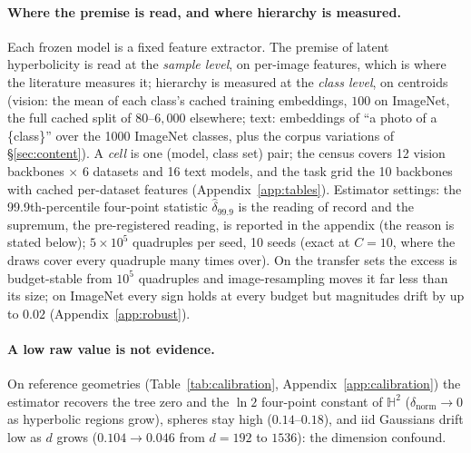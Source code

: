 \paragraph{Where the premise is read, and where hierarchy is measured.} Each frozen model is a fixed feature extractor. The premise of latent hyperbolicity is read at the \emph{sample level}, on per-image features, which is where the literature measures it; hierarchy is measured at the \emph{class level}, on centroids (vision: the mean of each class's cached training embeddings, $100$ on ImageNet, the full cached split of $80$--$6{,}000$ elsewhere; text: embeddings of ``a photo of a \{class\}'' over the 1000 ImageNet classes, plus the corpus variations of \S\ref{sec:content}). A \emph{cell} is one (model, class set) pair; the census covers 12 vision backbones $\times$ 6 datasets and 16 text models, and the task grid the 10 backbones with cached per-dataset features (Appendix~\ref{app:tables}).
Estimator settings: the 99.9th-percentile four-point statistic $\hat\delta_{99.9}$ is the reading of record and the supremum, the pre-registered reading, is reported in the appendix (the reason is stated below); $5{\times}10^5$ quadruples per seed, 10 seeds (exact at $C{=}10$, where the draws cover every quadruple many times over). On the transfer sets the excess is budget-stable from $10^5$ quadruples and image-resampling moves it far less than its size; on ImageNet every sign holds at every budget but magnitudes drift by up to $0.02$ (Appendix~\ref{app:robust}).

\paragraph{A low raw value is not evidence.} On reference geometries (Table~\ref{tab:calibration}, Appendix~\ref{app:calibration}) the estimator recovers the tree zero and the $\ln 2$ four-point constant of $\mathbb{H}^2$ ($\delta_{\text{norm}}\to0$ as hyperbolic regions grow), spheres stay high ($0.14$--$0.18$), and iid Gaussians drift low as $d$ grows ($0.104\to0.046$ from $d{=}192$ to $1536$): the dimension confound.

